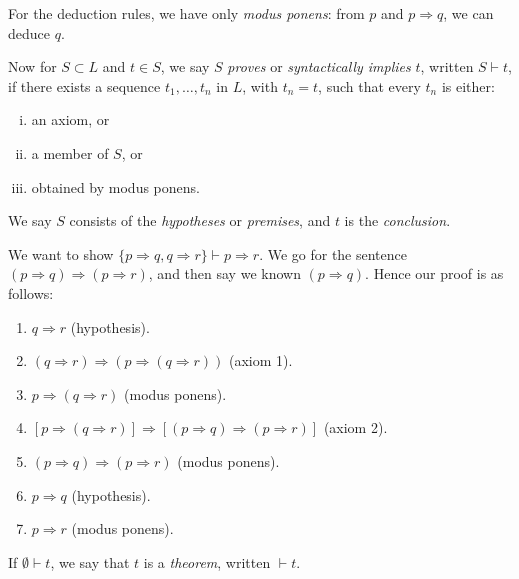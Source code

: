 \documentclass[12pt]{article}
\begin{document}
For the deduction rules, we have only \emph{modus ponens}: from $p$ and $p \Rightarrow q$, we can deduce $q$.

Now for $S \subset L$ and $t \in S$, we say $S$ \emph{proves} or \emph{syntactically implies} $t$, written $S \vdash t$, if there exists a sequence $t_1, \ldots, t_n$ in $L$, with $t_n = t$, such that every $t_n$ is either:
\begin{enumerate}[(i)]
	\item an axiom, or
	\item a member of $S$, or
	\item obtained by modus ponens.
\end{enumerate}

We say $S$ consists of the \emph{hypotheses} or \emph{premises}, and $t$ is the \emph{conclusion}.

\begin{exbox}
	We want to show $\{ p \Rightarrow q, q \Rightarrow r\} \vdash p \Rightarrow r$. We go for the sentence $(p \Rightarrow q) \Rightarrow (p \Rightarrow r)$, and then say we known $(p \Rightarrow q)$. Hence our proof is as follows:
	\begin{enumerate}
		\item $q \Rightarrow r$ (hypothesis).
		\item $(q \Rightarrow r) \Rightarrow (p \Rightarrow (q \Rightarrow r))$ (axiom 1).
		\item $p \Rightarrow (q \Rightarrow r)$ (modus ponens).
		\item $[p \Rightarrow (q \Rightarrow r)] \Rightarrow [(p \Rightarrow q) \Rightarrow (p \Rightarrow r)]$ (axiom 2).
		\item $(p \Rightarrow q) \Rightarrow (p \Rightarrow r)$ (modus ponens).
		\item $p \Rightarrow q$ (hypothesis).
		\item $p \Rightarrow r$ (modus ponens).
	\end{enumerate}
\end{exbox}

If $\emptyset \vdash t$, we say that $t$ is a \emph{theorem}, written $\vdash t$.
\end{document}
